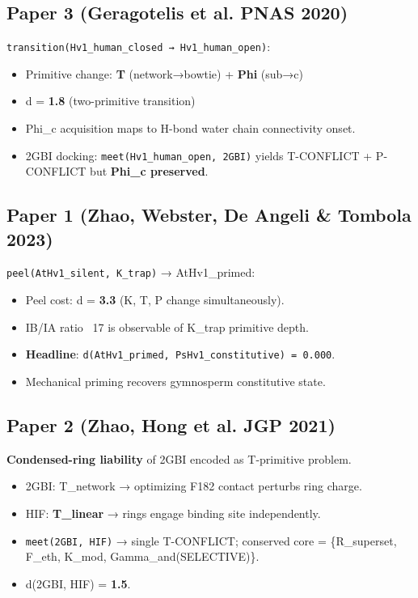 \documentclass[11pt, a4paper]{article}
\begin{document}
\subsection*{Paper 3 (Geragotelis et al. PNAS 2020)}
\texttt{transition(Hv1\_human\_closed → Hv1\_human\_open)}:
\begin{itemize}
    \item Primitive change: \textbf{T} (network→bowtie) + \textbf{Phi} (sub→c)
    \item d = \textbf{1.8} (two-primitive transition)
    \item Phi\_c acquisition maps to H-bond water chain connectivity onset.
    \item 2GBI docking: \texttt{meet(Hv1\_human\_open, 2GBI)} yields T-CONFLICT + P-CONFLICT but \textbf{Phi\_c preserved}.
\end{itemize}

\subsection*{Paper 1 (Zhao, Webster, De Angeli \& Tombola 2023)}
\texttt{peel(AtHv1\_silent, K\_trap)} → AtHv1\_primed:
\begin{itemize}
    \item Peel cost: d = \textbf{3.3} (K, T, P change simultaneously).
    \item IB/IA ratio ~17 is observable of K\_trap primitive depth.
    \item \textbf{Headline}: \texttt{d(AtHv1\_primed, PsHv1\_constitutive) = 0.000}.
    \item Mechanical priming recovers gymnosperm constitutive state.
\end{itemize}

\subsection*{Paper 2 (Zhao, Hong et al. JGP 2021)}
\textbf{Condensed-ring liability} of 2GBI encoded as T-primitive problem.
\begin{itemize}
    \item 2GBI: T\_network → optimizing F182 contact perturbs ring charge.
    \item HIF: \textbf{T\_linear} → rings engage binding site independently.
    \item \texttt{meet(2GBI, HIF)} → single T-CONFLICT; conserved core = \{R\_superset, F\_eth, K\_mod, Gamma\_and(SELECTIVE)\}.
    \item d(2GBI, HIF) = \textbf{1.5}.
\end{itemize}
\end{document}
